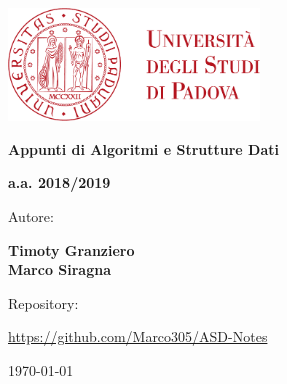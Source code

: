 

%



\begin{titlepage} 
	\centering
	\includegraphics[width=0.50\textwidth]{img/logo.pdf}\par\vspace{1cm} %
	
	{\LARGE\bfseries Appunti di Algoritmi e Strutture Dati \par}
	\vspace{1cm}
	
	{\Large\bfseries a.a. 2018/2019 \par}
	
	\vspace{1cm} 

	Autore: \par
	{\bfseries Timoty Granziero \\ Marco Siragna \par} 
	
	\vspace{1cm}

	Repository: \par
	\url{https://github.com/Marco305/ASD-Notes}
    
    \vfill
	
	{\large \today\par}
	
\end{titlepage}

\setcounter{page}{1}

\newpage
\tableofcontents
\newpage

\frenchspacing

\setcounter{page}{1}


 
 
 



















%
%

